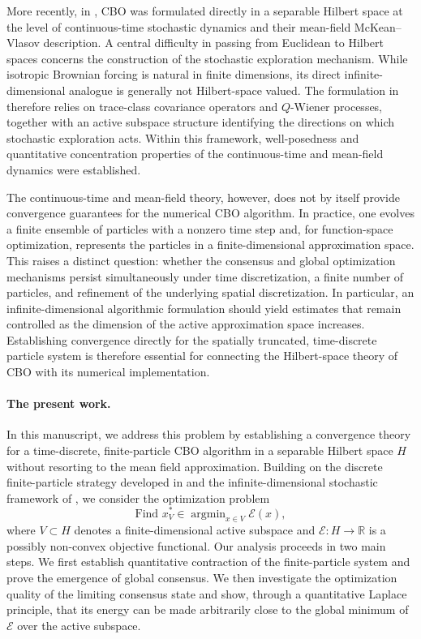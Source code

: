 \documentclass[12pt]{amsart}
\DeclareMathOperator*{\argmin}{argmin}
\numberwithin{equation}{section}
\begin{document}
More recently, in \cite{huang2026derivative}, CBO was formulated directly in a separable Hilbert space at the level of continuous-time stochastic dynamics and their mean-field McKean--Vlasov description. A central difficulty in passing from Euclidean to Hilbert spaces concerns the construction of the stochastic exploration mechanism. While isotropic Brownian forcing is natural in finite dimensions, its direct infinite-dimensional analogue is generally not Hilbert-space valued. The formulation in \cite{huang2026derivative} therefore relies on trace-class covariance operators and $Q$-Wiener processes, together with an active subspace structure identifying the directions on which stochastic exploration acts. Within this framework, well-posedness and quantitative concentration properties of the continuous-time and mean-field dynamics were established.

The continuous-time and mean-field theory, however, does not by itself provide convergence guarantees for the numerical CBO algorithm. In practice, one evolves a finite ensemble of particles with a nonzero time step and, for function-space optimization, represents the particles in a finite-dimensional approximation space. This raises a distinct question: whether the consensus and global optimization mechanisms persist simultaneously under time discretization, a finite number of particles, and refinement of the underlying spatial discretization. In particular, an infinite-dimensional algorithmic formulation should yield estimates that remain controlled as the dimension of the active approximation space increases. Establishing convergence directly for the spatially truncated, time-discrete particle system is therefore essential for connecting the Hilbert-space theory of CBO with its numerical implementation.

\paragraph{\textbf{The present work.}}
In this manuscript, we address this problem by establishing a convergence theory for a time-discrete, finite-particle CBO algorithm in a separable Hilbert space $H$ without resorting to the mean field approximation. Building on the discrete finite-particle strategy developed in \cite{ha2020convergence,ha2021convergence} and the infinite-dimensional stochastic framework of \cite{huang2026derivative}, we consider the optimization problem
\begin{equation*}
    \text{Find } x_V^* \in \argmin_{x\in V}\mathscr{E}(x),
\end{equation*}
where $V\subset H$ denotes a finite-dimensional active subspace and $\mathscr{E}:H\to\mathbb{R}$ is a possibly non-convex objective functional. Our analysis proceeds in two main steps. We first establish quantitative contraction of the finite-particle system and prove the emergence of global consensus. We then investigate the optimization quality of the limiting consensus state and show, through a quantitative Laplace principle, that its energy can be made arbitrarily close to the global minimum of $\mathscr{E}$ over the active subspace.
\end{document}
